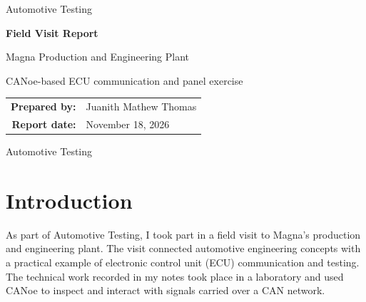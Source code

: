 \documentclass[12pt,a4paper]{article}
\begin{document}
\begin{titlepage}
    \centering
    \vspace*{2cm}
    {\Large Automotive Testing\par}
    \vspace{1.8cm}
    {\huge\bfseries Field Visit Report\par}
    \vspace{0.5cm}
    {\LARGE Magna Production and Engineering Plant\par}
    \vspace{1.5cm}
    {\large CANoe-based ECU communication and panel exercise\par}
    \vfill
    \begin{tabular}{>{\bfseries}rl}
        Prepared by: & Juanith Mathew Thomas\\
        Report date: & November 18, 2026
    \end{tabular}
    \vfill
    {\large Automotive Testing\par}
\end{titlepage}

\tableofcontents
\clearpage
{}

\begin{abstract}
This report describes a field visit to Magna's production and engineering plant, with a focus on the hands-on automotive testing exercise documented during the visit. Using a provided Vector CANoe configuration and a CAN/LIN interface, I examined ECU status messages, followed an alive counter, and built a software panel for interacting with signals. The final panel brought together three widgets: a numeric display, a meter, and a slider. Moving the potentiometer control changed its reported status, while CANoe's trace and graphics views helped relate signal values to network traffic. Oscilloscope captures also show CAN frame activity at the physical layer. The account follows the available notes and photographs; it does not invent plant-tour details or undocumented ECU specifications.
\end{abstract}

\section{Introduction}

As part of Automotive Testing, I took part in a field visit to Magna's production and engineering plant. The visit connected automotive engineering concepts with a practical example of electronic control unit (ECU) communication and testing. The technical work recorded in my notes took place in a laboratory and used CANoe to inspect and interact with signals carried over a CAN network.
\end{document}
